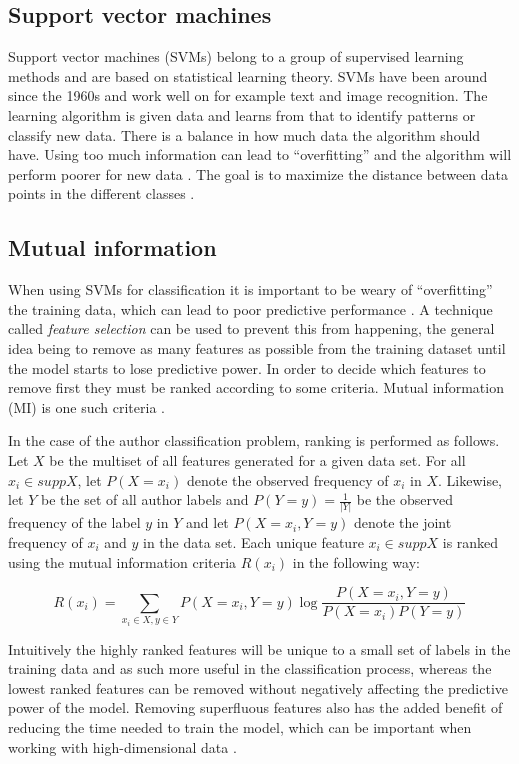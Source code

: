 \documentclass[a4paper,11pt]{kth-mag}
\begin{document}
\subsection{Support vector machines}
\label{sec:svms}
Support vector machines (SVMs) belong to a group of supervised learning methods
and are based on statistical learning theory. SVMs have been around since the
1960s and work well on for example text and image recognition. The learning
algorithm is given data and learns from that to identify patterns or classify
new data. There is a balance in how much data the algorithm should have. Using
too much information can lead to ``overfitting'' and the algorithm will perform
poorer for new data \parencite{cristianini2000introduction}. The goal is to
maximize the distance between data points in the different classes
 \parencite{awad2004effective}. 

\subsection{Mutual information}
\label{sec:mi}
When using SVMs for classification it is important to be weary of
``overfitting'' the training data, which can lead to poor predictive
performance \parencite{cristianini2000introduction}. A technique called
\emph{feature selection} can be used to prevent this from happening, the
general idea being to remove as many features as possible from the training
dataset until the model starts to lose predictive power. In order to decide
which features to remove first they must be ranked according to some criteria.
Mutual information (MI) is one such criteria \parencite{guyon2003introduction}.

In the case of the author classification problem, ranking is performed as
follows. Let $X$ be the multiset of all features generated for a given data
set. For all $x_i \in supp X$, let $P(X = x_i)$ denote the observed frequency
of $x_i$ in $X$. Likewise, let $Y$ be the set of all author labels and $P(Y =
y)= \frac{1}{|Y|}$ be the observed frequency of the label $y$ in $Y$ and let
$P(X=x_i,Y=y)$ denote the joint frequency of $x_i$ and $y$ in the data set.
Each unique feature $x_i \in supp X $ is ranked using the mutual information
criteria $R(x_i)$ \parencite{guyon2003introduction} in the following way:

$$R(x_i)= \sum_{x_i \in X, y \in Y} P(X=x_i,Y=y) \log \frac{P(X = x_i,
Y = y)}{P(X = x_i)P(Y = y)}$$

Intuitively the highly ranked features will be unique to a small set of 
labels in the training data and as such more useful in the classification
process, whereas the lowest ranked features can be removed without negatively
affecting the predictive power of the model. Removing superfluous features also
has the added benefit of reducing the time needed to train the model, which can
be important when working with high-dimensional data
\parencite{guyon2003introduction}.
\end{document}

